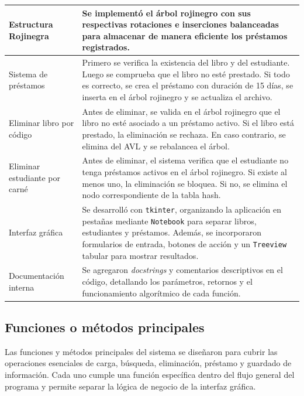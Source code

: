 \documentclass[11pt]{article}
\begin{document}
\begin{longtable}{p{} p{}}
\midrule
Estructura Rojinegra & Se implementó el árbol rojinegro con sus respectivas rotaciones e inserciones balanceadas para almacenar de manera eficiente los préstamos registrados. \\
\midrule
Sistema de préstamos & Primero se verifica la existencia del libro y del estudiante. Luego se comprueba que el libro no esté prestado. Si todo es correcto, se crea el préstamo con duración de 15 días, se inserta en el árbol rojinegro y se actualiza el archivo. \\
\midrule
Eliminar libro por código & Antes de eliminar, se valida en el árbol rojinegro que el libro no esté asociado a un préstamo activo. Si el libro está prestado, la eliminación se rechaza. En caso contrario, se elimina del AVL y se rebalancea el árbol. \\
\midrule
Eliminar estudiante por carné & Antes de eliminar, el sistema verifica que el estudiante no tenga préstamos activos en el árbol rojinegro. Si existe al menos uno, la eliminación se bloquea. Si no, se elimina el nodo correspondiente de la tabla hash. \\
\midrule
Interfaz gráfica & Se desarrolló con \texttt{tkinter}, organizando la aplicación en pestañas mediante \texttt{Notebook} para separar libros, estudiantes y préstamos. Además, se incorporaron formularios de entrada, botones de acción y un \texttt{Treeview} tabular para mostrar resultados. \\
\midrule
Documentación interna & Se agregaron \textit{docstrings} y comentarios descriptivos en el código, detallando los parámetros, retornos y el funcionamiento algorítmico de cada función. \\
\bottomrule
\end{longtable}

\subsection{Funciones o métodos principales}

Las funciones y métodos principales del sistema se diseñaron para cubrir las operaciones esenciales de carga, búsqueda, eliminación, préstamo y guardado de información. Cada uno cumple una función específica dentro del flujo general del programa y permite separar la lógica de negocio de la interfaz gráfica.
\end{document}
